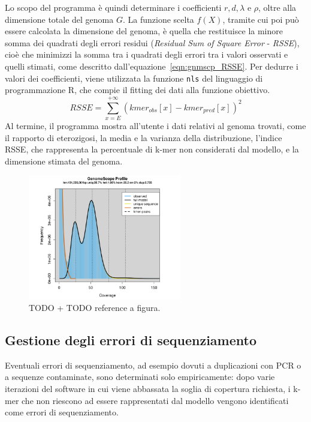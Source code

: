 \documentclass[crop=false, class=book]{standalone}
\begin{document}
	Lo scopo del programma è quindi determinare i coefficienti $r, d, \lambda$ e $\rho$, oltre alla dimensione totale del genoma $G$. La funzione scelta $f(X)$, tramite cui poi può essere calcolata la dimensione del genoma, è quella che restituisce la minore somma dei quadrati degli errori residui (\textit{Residual Sum of Square Error} - \textit{RSSE}), cioè che minimizzi la somma tra i quadrati degli errori tra i valori osservati e quelli stimati, come descritto dall'equazione~\vref{eqn:gnmscp_RSSE}. Per dedurre i valori dei coefficienti, viene utilizzata la funzione \verb|nls| del linguaggio di programmazione R, che compie il \gls{fitting} dei dati alla funzione obiettivo.
	\begin{equation}
		RSSE = \sum_{x=E}^{+\infty} \left(kmer_{obs}[x] - kmer_{pred}[x]\right)^2
	\label{eqn:gnmscp_RSSE}
	\end{equation}
	Al termine, il programma mostra all'utente i dati relativi al genoma trovati, come il rapporto di eterozigosi, la media e la varianza della distribuzione, l'indice RSSE, che rappresenta la percentuale di k-mer non considerati dal modello, e la dimensione stimata del genoma.
	
	\begin{figure}
		\centering
		\includegraphics[width=0.6\textwidth]{capitoli/genomescope/gnmscp_genomescopeprofile.png}
		\caption{TODO + TODO reference a figura.}
		\label{fig:gnmscp_genomescopeprofile}
	\end{figure}


	\subsection{Gestione degli errori di sequenziamento}
	Eventuali errori di sequenziamento, ad esempio dovuti a duplicazioni con PCR o a sequenze contaminate, sono determinati solo empiricamente: dopo varie iterazioni del software in cui viene abbassata la soglia di copertura richiesta, i k-mer che non riescono ad essere rappresentati dal modello vengono identificati come errori di sequenziamento. 
	
\end{document}
